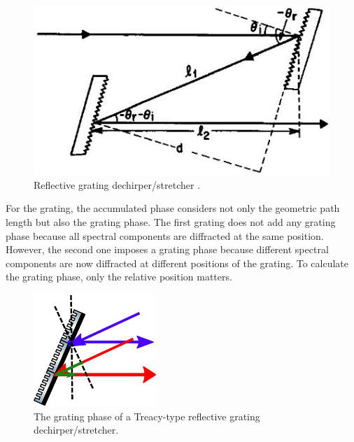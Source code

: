 \documentclass[12pt,hidelinks]{book}
\begin{document}
\begin{figure}[htbp]
\centering
\includegraphics[width=0.5\linewidth]{reflective grating compressor.jpg}
\caption{Reflective grating dechirper/stretcher \cite{Agrawal2008}.}
\label{fig:RGC}
\end{figure}

For the grating, the accumulated phase considers not only the geometric path length but also the grating phase. The first grating does not add any grating phase because all spectral components are diffracted at the same position. However, the second one imposes a grating phase because different spectral components are now diffracted at different positions of the grating. To calculate the grating phase, only the relative position matters.

\begin{figure}[htbp]
\centering
\includegraphics[width=0.2\linewidth]{reflective Treacy_grating phase.pdf}
\caption{The grating phase of a Treacy-type reflective grating dechirper/stretcher.}
\label{fig:reflective_Treacy_grating_phase}
\end{figure}
\end{document}
